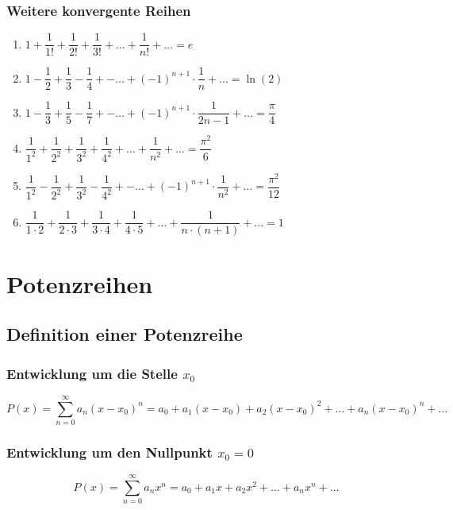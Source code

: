 \subsubsection{Weitere konvergente Reihen}
\begin{enumerate}[$(a)$]
\item $1+\dfrac{1}{1!}+\dfrac{1}{2!}+\dfrac{1}{3!}+\dotso+\dfrac{1}{n!}+\dotso=e$
\item $1-\dfrac{1}{2}+\dfrac{1}{3}-\dfrac{1}{4}+-\dotso+\left(-1\right)^{n+1}\cdot \dfrac{1}{n}+\dotso=\ln\left(2\right)$
\item $1-\dfrac{1}{3}+\dfrac{1}{5}-\dfrac{1}{7}+-\dotso+\left(-1\right)^{n+1}\cdot \dfrac{1}{2n-1}+\dotso=\dfrac{\pi}{4}$
\item $\dfrac{1}{1^2}+\dfrac{1}{2^2}+\dfrac{1}{3^2}+\dfrac{1}{4^2}+\dotso+\dfrac{1}{n^2}+\dotso=\dfrac{\pi^2}{6}$
\item $\dfrac{1}{1^2}-\dfrac{1}{2^2}+\dfrac{1}{3^2}-\dfrac{1}{4^2}+-\dotso+\left(-1\right)^{n+1}\cdot \dfrac{1}{n^2}+\dotso=\dfrac{\pi^2}{12}$
\item $\dfrac{1}{1\cdot 2}+\dfrac{1}{2\cdot 3}+\dfrac{1}{3\cdot 4}+\dfrac{1}{4\cdot 5}+\dotso+\dfrac{1}{n\cdot \left(n+1\right)}+\dotso=1$
\end{enumerate}
\section{Potenzreihen}
\subsection{Definition einer Potenzreihe}
\subsubsection{Entwicklung um die Stelle $x_0$}
\begin{equation}
\boxed{P\left(x\right)=\displaystyle \sum_{n=0}^{\infty}a_n \left(x-x_0\right)^n=a_0+a_1 \left(x-x_0\right)+a_2 \left(x-x_0\right)^2+\dotso+a_n \left(x-x_0\right)^n+\dotso}
\end{equation}
\subsubsection{Entwicklung um den Nullpunkt $x_0=0$}
\begin{equation}
\boxed{P\left(x\right)=\displaystyle \sum_{n=0}^{\infty}a_nx^n=a_0+a_1x+a_2x^2+\dotso+a_nx^n+\dotso}
\end{equation}
